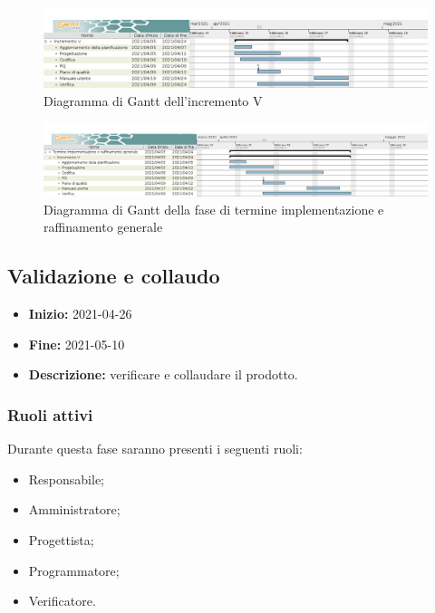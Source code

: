 \begin{figure}[H]
    \centering
    \includegraphics[width=1\linewidth]{res/images/pianificazione/incremento_5.png}
    \caption{Diagramma di Gantt dell'incremento V}
    \label{fig:_Gantt incremento V}
\end{figure}

\begin{figure}[H]
    \centering
    \includegraphics[width=1\linewidth]{res/images/pianificazione/termine_implementazione_e_raffinamento_generale.png}
    \caption{Diagramma di Gantt della fase di termine implementazione e raffinamento generale}
    \label{fig:_Gantt termine implementazione e raffinamento generale}
\end{figure}


\subsection{Validazione e collaudo} \label{_pianificazioneValidazioneCollaudo}
\begin{itemize}
    \item [] \textbf{Inizio:} 2021-04-26
    \item [] \textbf{Fine:} 2021-05-10
    \item [] \textbf{Descrizione:} verificare e collaudare il prodotto.
\end{itemize}

\subsubsection{Ruoli attivi}
Durante questa fase saranno presenti i seguenti ruoli:
\begin{itemize}
    \item Responsabile;
    \item Amministratore;
    \item Progettista;
    \item Programmatore;
    \item Verificatore.
\end{itemize}

